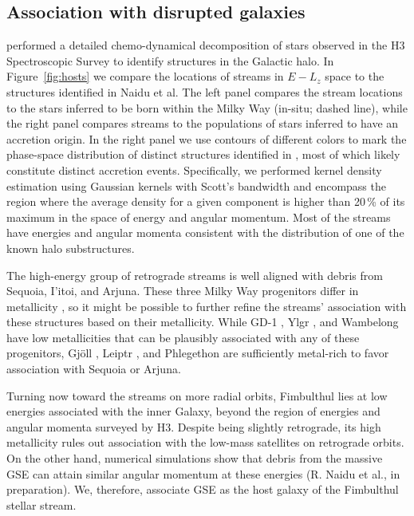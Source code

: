 \documentclass[twocolumn]{aastex63}
\newcommand{\feh}{\ensuremath{\textrm{[Fe/H]}}}
\begin{document}
\subsection{Association with disrupted galaxies}
\label{sec:hosts}

\citet{naidu2020} performed a detailed chemo-dynamical decomposition of stars observed in the H3 Spectroscopic Survey to identify structures in the Galactic halo.
In Figure~\ref{fig:hosts} we compare the locations of streams in $E-L_z$ space to the structures identified in Naidu et al.
The left panel compares the stream locations to the stars inferred to be born within the Milky Way (in-situ; dashed line), while the right panel compares streams to the populations of stars inferred to have an accretion origin.
In the right panel we use contours of different colors to mark the phase-space distribution of distinct structures identified in \citet{naidu2020}, most of which likely constitute distinct accretion events.
Specifically, we performed kernel density estimation using Gaussian kernels with Scott's bandwidth and encompass the region where the average density for a given component is higher than 20\,\% of its maximum in the space of energy and angular momentum.
Most of the streams have energies and angular momenta consistent with the distribution of one of the known halo substructures.

The high-energy group of retrograde streams is well aligned with debris from Sequoia, I'itoi, and Arjuna.
These three Milky Way progenitors differ in metallicity \citep{naidu2020}, so it might be possible to further refine the streams' association with these structures based on their metallicity.
While GD-1 \citep[spectroscopic $\feh=-2.3$,][]{bonaca2020b}, Ylgr \citep[spectroscopic $\feh=-1.9$,][]{ibata2019}, and  Wambelong \citep[isochrone $\feh=-2.2$,][]{shipp2018} have low metallicities that can be plausibly associated with any of these progenitors, Gj\" oll \citep[spectroscopic $\feh=-1.5$,][]{hansen2020}, Leiptr \citep[isochrone $\feh=-1.6$,][]{ibata2019}, and Phlegethon \citep[spectroscopic $\feh=-1.6$,][]{ibata2018} are sufficiently metal-rich to favor association with Sequoia or Arjuna.

Turning now toward the streams on more radial orbits, Fimbulthul lies at low energies associated with the inner Galaxy, beyond the region of energies and angular momenta surveyed by H3.
Despite being slightly retrograde, its high metallicity rules out association with the low-mass satellites on retrograde orbits.
On the other hand, numerical simulations show that debris from the massive GSE can attain similar angular momentum at these energies (R. Naidu et al., in preparation).
We, therefore, associate GSE as the host galaxy of the Fimbulthul stellar stream.
\end{document}
